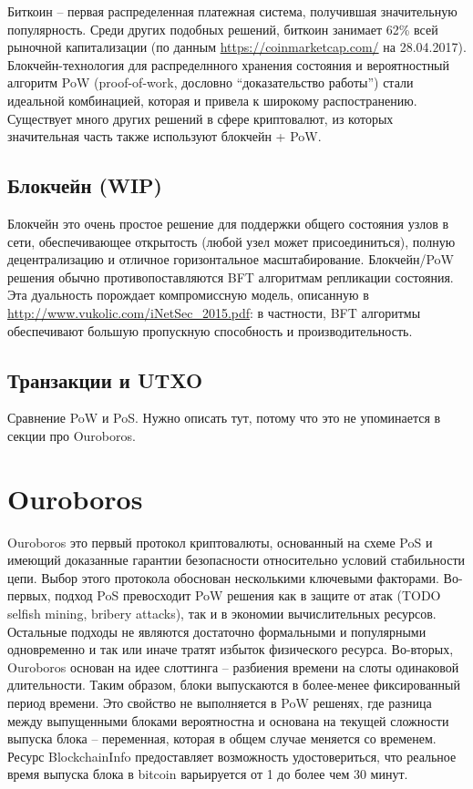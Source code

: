 \documentclass[]{itmo-student-thesis}
\begin{document}
Биткоин -- первая распределенная платежная система, получившая
значительную популярность. Среди других подобных решений, биткоин
занимает 62\% всей рыночной капитализации (по данным
\url{https://coinmarketcap.com/} на 28.04.2017). Блокчейн-технология
для распределнного хранения состояния и вероятностный алгоритм PoW
(proof-of-work, дословно ``доказательство работы'') стали идеальной
комбинацией, которая и привела к широкому распостранению. Существует
много других решений в сфере криптовалют, из которых значительная
часть также используют блокчейн + PoW.

\subsection{Блокчейн (WIP)}

Блокчейн это очень простое решение для поддержки общего состояния
узлов в сети, обеспечивающее открытость (любой узел может
присоединиться), полную децентрализацию и отличное горизонтальное
масштабирование. Блокчейн/PoW решения обычно противопоставляются BFT
алгоритмам репликации состояния. Эта дуальность порождает
компромиссную модель, описанную в
\url{http://www.vukolic.com/iNetSec_2015.pdf}: в частности, BFT
алгоритмы обеспечивают большую пропускную способность и
производительность.

\subsection{Транзакции и UTXO}

Сравнение PoW и PoS. Нужно описать тут, потому что это не упоминается
в секции про Ouroboros.

\section{Ouroboros}

Ouroboros это первый протокол криптовалюты, основанный на схеме PoS и
имеющий доказанные гарантии безопасности относительно условий
стабильности цепи. Выбор этого протокола обоснован несколькими
ключевыми факторами. Во-первых, подход PoS превосходит PoW решения как
в защите от атак (TODO selfish mining, bribery attacks), так и в
экономии вычислительных ресурсов. Остальные подходы не являются
достаточно формальными и популярными одновременно и так или иначе
тратят избыток физического ресурса. Во-вторых, Ouroboros основан на
идее слоттинга -- разбиения времени на слоты одинаковой
длительности. Таким образом, блоки выпускаются в более-менее
фиксированный период времени. Это свойство не выполняется в PoW
решенях, где разница между выпущенными блоками вероятностна и основана
на текущей сложности выпуска блока -- переменная, которая в общем
случае меняется со временем. Ресурс BlockchainInfo предоставляет
возможность удостовериться, что реальное время выпуска блока в bitcoin
варьируется от 1 до более чем 30 минут.
\end{document}
